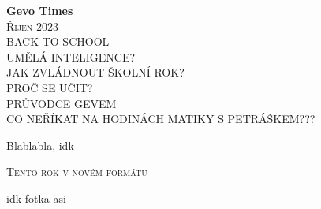 \documentclass[twoside, 12pt]{article}
\begin{document}
\begin{titlepage}
    \begin{center}
    {\fontsize{40}{50} \bf{\selectfont Gevo Times}}\\[1.5cm]
    \textsc{\LARGE Říjen 2023}\\[2.5cm]
    \textsc{\Large BACK TO SCHOOL}\\[1.5cm]
    \textsc{\large UMĚLÁ INTELIGENCE?}\\[1cm]
    \textsc{\large JAK ZVLÁDNOUT ŠKOLNÍ ROK?}\\[0.5cm]
    \textsc{\large PROČ SE UČIT?}\\[0.5cm]
    \textsc{\large PRŮVODCE GEVEM}\\[0.5cm]
    \textsc{\normalsize CO NEŘÍKAT NA HODINÁCH MATIKY S PETRÁŠKEM???}\\[0.5cm]
    \end{center}
\end{titlepage}


\clearpage
\rhead{}
Blablabla, idk \\
\lipsum[1]
\begin{center}
    \textsc{\Large Tento rok v novém formátu}\\[1.5cm]
\end{center}
idk fotka asi
\clearpage

\clearpage
\end{document}
